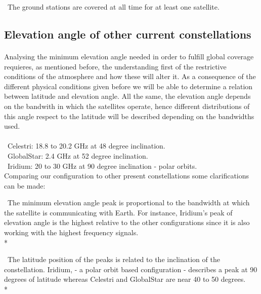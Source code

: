 \documentclass{article}
\begin{document}
\textendash\ The ground stations are covered at all time for at least one satellite.\\

\subsection{Elevation angle of other current constellations}

\paragraph{}

Analysing the minimum elevation angle needed in order to fulfill global coverage requieres, as mentioned before, the understanding first of the restrictive conditions of the atmosphere and how these will alter it. As a consequence of the different physical conditions given before we will be able to determine a relation between latitude and elevation angle. All the same, the elevation angle depends on the bandwith in which the satellites operate, hence different distributions of this angle respect to the latitude will be described depending on the bandwidths used. 


\paragraph{}

\textendash\ Celestri: 18.8 to 20.2 GHz at 48 degree inclination.\\
\textendash\ GlobalStar: 2.4 GHz at 52 degree inclination.\\
\textendash\ Iridium: 20 to 30 GHz at 90 degree inclination - polar orbits.\\

Comparing our configuration to other present constellations some clarifications can be made: 

\textendash\ The minimum elevation angle peak is proportional to the bandwidth at which the satellite is communicating with Earth. For instance, Iridium's peak of elevation angle is the highest relative to the other configurations since it is also working with the highest frequency signals. \\*

\textendash\ The latitude position of the peaks is related to the inclination of the constellation. Iridium, - a polar orbit based configuration - describes a peak at 90 degrees of latitude whereas Celestri and GlobalStar are near 40 to 50 degrees. \\*
\end{document}
